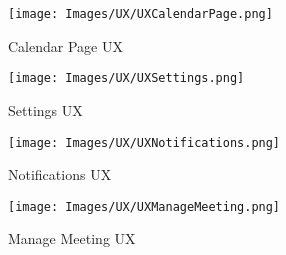 \begin{figure}[h]
	\centering\texttt{[image: Images/UX/UXCalendarPage.png]}{}
	\caption{Calendar Page UX}
\end{figure}

\begin{figure}[h]
	\centering\texttt{[image: Images/UX/UXSettings.png]}{}
	\caption{Settings UX}
\end{figure}

\begin{figure}[h]
	\centering\texttt{[image: Images/UX/UXNotifications.png]}{}
	\caption{Notifications UX}
\end{figure}

\begin{figure}[h]
	\centering\texttt{[image: Images/UX/UXManageMeeting.png]}{}
	\caption{Manage Meeting UX}
\end{figure}
\clearpage